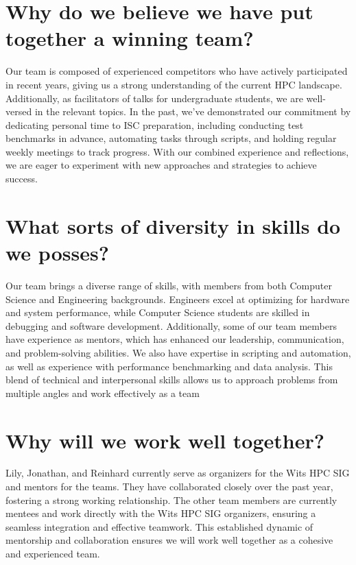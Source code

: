\documentclass[10pt, onecolumn]{IEEEtran}
\begin{document}
\section{Why do we believe we have put together a winning team?}
\noindent
Our team is composed of experienced competitors who have actively participated in recent years, giving us a strong understanding of the current HPC landscape. Additionally, as facilitators of talks for undergraduate students, we are well-versed in the relevant topics. In the past, we've demonstrated our commitment by dedicating personal time to ISC preparation, including conducting test benchmarks in advance, automating tasks through scripts, and holding regular weekly meetings to track progress. With our combined experience and reflections, we are eager to experiment with new approaches and strategies to achieve success.
\section{What sorts of diversity in skills do we posses?}
\noindent
Our team brings a diverse range of skills, with members from both Computer Science and Engineering backgrounds. Engineers excel at optimizing for hardware and system performance, while Computer Science students are skilled in debugging and software development. Additionally, some of our team members have experience as mentors, which has enhanced our leadership, communication, and problem-solving abilities. We also have expertise in scripting and automation, as well as experience with performance benchmarking and data analysis. This blend of technical and interpersonal skills allows us to approach problems from multiple angles and work effectively as a team
\section{Why will we work well together?} 
\noindent
Lily, Jonathan, and Reinhard currently serve as organizers for the Wits HPC SIG and mentors for the teams. They have collaborated closely over the past year, fostering a strong working relationship. The other team members are currently mentees and work directly with the Wits HPC SIG organizers, ensuring a seamless integration and effective teamwork. This established dynamic of mentorship and collaboration ensures we will work well together as a cohesive and experienced team.
\end{document}

